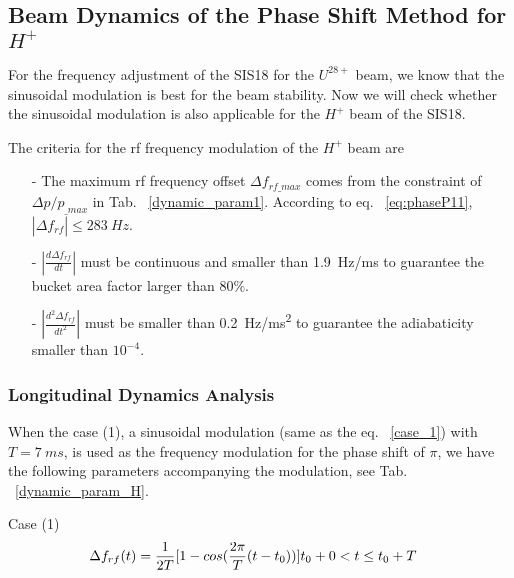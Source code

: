 
\subsection{Beam Dynamics of the Phase Shift Method for $H^+$} 

For the frequency adjustment of the SIS18 for the $U^\mathit{28+}$ beam, we know that the sinusoidal modulation is best for the beam stability. Now we will check whether the sinusoidal modulation is also applicable for the $H^+$ beam of the SIS18.

The criteria for the rf frequency modulation of the $H^+$ beam are
\begin{itemize}
\item[-]
The maximum rf frequency offset $\Delta f_\mathit{rf\_max}$ comes from the constraint of $\Delta p/p_\mathit{\_max}$ in Tab. ~\ref{dynamic_param1}. According to eq. ~\ref{eq:phaseP11}, $|\Delta f_\mathit{rf}| \le \SI{283}{Hz}$.
\item[-]
$|\frac{d\Delta f_{\mathit{rf}}}{dt}|$ must be continuous and smaller than \SI{1.9}{Hz/ms} to guarantee the bucket area factor larger than $80\%$. 
\item[-]
$|\frac{d^2\Delta f_{\mathit{rf}}}{dt^2}|$ must be smaller than \SI{0.2}{Hz/ms^2} to guarantee the adiabaticity smaller than $10^{-4}$.
\end{itemize}

	\subsubsection{Longitudinal Dynamics Analysis}
When the case (1), a sinusoidal modulation (same as the eq. ~\ref{case_1}) with $T=\SI{7}{ms}$, is used as the frequency modulation for the phase shift of $\pi$, we have the following parameters accompanying the modulation, see Tab. ~\ref{dynamic_param_H}. 

Case (1) 
\begin{eqnarray}
\Delta f_{rf}(t)=
\frac{1}{2T}  [1-cos(\frac{2\pi}{T}(t-t_0))] &t_0+0<t\le t_0+T\cr  
\end{eqnarray}

